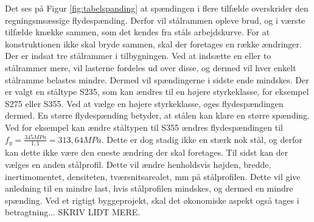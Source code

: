 Det ses på Figur \ref{fig:tabelspanding} at spændingen i flere tilfælde overskrider den regningsmsæssige flydespænding. Derfor vil stålrammen opleve brud, og i værste tilfælde knække sammen, som det kendes fra ståls arbejdskurve.
\newline 
\newline
For at konstruktionen ikke skal bryde sammen, skal der foretages en række ændringer.
\newline \indent{     }  Der er indsat tre stålrammer i tilbygningen. Ved at indsætte en eller to stålrammer mere, vil lasterne fordeles ud over disse, og dermed vil hver enkelt stålramme belastes mindre. Dermed vil spændingerne i sidste ende mindskes. 
\newline \indent{     }  Der er valgt en ståltype S235, som kan ændres til en højere styrkeklasse, for eksempel S275 eller S355. Ved at vælge en højere styrkeklasse, øges flydespændingen dermed. En større flydespænding betyder, at stålen kan klare en større spænding. Ved for eksempel kan ændre ståltypen til S355 ændres flydespændingen til $f_y = \frac{345 MPa}{1,\!1} = 313,\!64 MPa$. Dette er dog stadig ikke en stærk nok stål, og derfor kan dette ikke være den eneste ændring der skal foretages. 
\newline \indent{     }  Til sidst kan der vælges en anden stålprofil. Dette vil ændre henholdsvis højden, bredde, inertimomentet, densiteten, tværsnitsarealet, mm på stålprofilen. Dette vil give anledning til en mindre last, hvis stålprofilen mindskes, og dermed en mindre spænding. 
\newline
\newline
Ved et rigtigt byggeprojekt, skal det økonomiske aspekt også tages i betragtning... SKRIV LIDT MERE. 